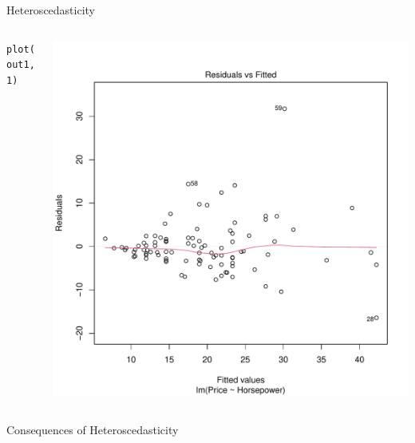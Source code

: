 \documentclass[10pt]{beamer}\usepackage[]{graphicx}\usepackage[]{color}
\makeatletter
\def\maxwidth{ %
  \ifdim\Gin@nat@width>\linewidth
    \linewidth
  \else
    \Gin@nat@width
  \fi
}
\newcommand{\hlnum}[1]{\textcolor[rgb]{0.69,0.494,0}{#1}}%
\newcommand{\hlstd}[1]{\textcolor[rgb]{0,0,0}{#1}}%
\newcommand{\hlkwd}[1]{\textcolor[rgb]{0.004,0.004,0.506}{#1}}%
\newenvironment{kframe}{%
 \def\at@end@of@kframe{}%
 \ifinner\ifhmode%
  \def\at@end@of@kframe{\end{minipage}}%
  \begin{minipage}{\columnwidth}%
 \fi\fi%
 \def\FrameCommand##1{\hskip\@totalleftmargin \hskip-\fboxsep
 \colorbox{shadecolor}{##1}\hskip-\fboxsep
     \hskip-\linewidth \hskip-\@totalleftmargin \hskip\columnwidth}%
 \MakeFramed {\advance\hsize-\width
   \@totalleftmargin\z@ \linewidth\hsize
   \@setminipage}}%
 {\par\unskip\endMakeFramed%
 \at@end@of@kframe}
\newenvironment{knitrout}{}{} %
\makeatother
\begin{document}
{\begin{frame}[fragile]{Heteroscedasticity}
\begin{columns}
\begin{column}{0.5\textwidth}
\begin{knitrout}
\begin{kframe}
\begin{alltt}
\hlkwd{plot}\hlstd{(out1,} \hlnum{1}\hlstd{)}
\end{alltt}
\end{kframe}
\end{knitrout}

\end{column}
\begin{column}{0.5\textwidth}

\begin{knitrout}\footnotesize
{}\color{fgcolor}

{\centering \includegraphics[width=\maxwidth]{figure/assumptions-unnamed-chunk-8-1} 

}


\end{knitrout}

\end{column}
\end{columns}

\end{frame}

\watermarkon %

\begin{frame}{Consequences of Heteroscedasticity}


\end{frame}}
\end{document}
